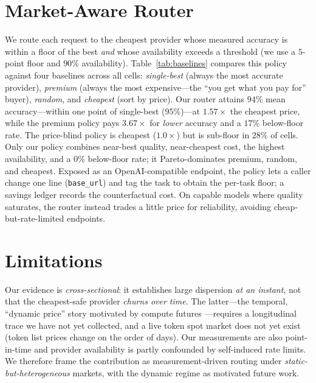 \documentclass{article}
\begin{document}
\section{Market-Aware Router}\label{sec:router}
We route each request to the cheapest provider whose measured accuracy is within a floor of the
best \emph{and} whose availability exceeds a threshold (we use a $5$-point floor and $90\%$
availability). Table~\ref{tab:baselines} compares this policy against four baselines across all
\numcells{} cells: \emph{single-best} (always the most accurate provider), \emph{premium}
(always the most expensive---the ``you get what you pay for'' buyer), \emph{random}, and
\emph{cheapest} (sort by price). Our router attains $94\%$ mean accuracy---within one point of
single-best ($95\%$)---at $1.57\times$ the cheapest price, while the premium policy pays
$3.67\times$ for \emph{lower} accuracy and a $17\%$ below-floor rate. The price-blind policy is
cheapest ($1.0\times$) but is sub-floor in $28\%$ of cells. Only our policy combines near-best
quality, near-cheapest cost, the highest availability, and a $0\%$ below-floor rate; it
Pareto-dominates premium, random, and cheapest. Exposed as an OpenAI-compatible endpoint, the
policy lets a caller change one line (\texttt{base\_url}) and tag the task to obtain the per-task
floor; a savings ledger records the counterfactual cost. On capable models where quality
saturates, the router instead trades a little price for reliability, avoiding
cheap-but-rate-limited endpoints.

\begin{table}[t]\centering\small
\caption{Routing policy comparison over all \numcells{} (model$\times$task) cells. Rel.\ cost
normalizes each cell to its cheapest provider ($=1.0$). Below-floor is the fraction of cells
whose pick falls below the cell's quality floor. $^\ast$averaged per cell.}
\label{tab:baselines}

\end{table}

\section{Limitations}
Our evidence is \emph{cross-sectional}: it establishes large dispersion \emph{at an instant},
not that the cheapest-safe provider \emph{churns over time}. The latter---the temporal,
``dynamic price'' story motivated by compute futures \citep{cme2026compute}---requires a
longitudinal trace we have not yet collected, and a live token spot market does not yet exist
(token list prices change on the order of days). Our measurements are also point-in-time and
provider availability is partly confounded by self-induced rate limits. We therefore frame the
contribution as measurement-driven routing under \emph{static-but-heterogeneous} markets, with
the dynamic regime as motivated future work.
\end{document}
